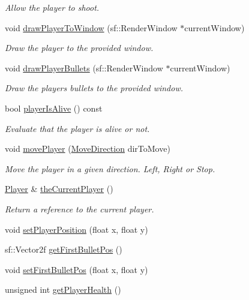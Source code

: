 \begin{DoxyCompactItemize}
\begin{DoxyCompactList}\small\item\em Allow the player to shoot. \end{DoxyCompactList}\item 
void \hyperlink{class_player_manager_a8dfbc91721f7c9cfeae80ae7fa89602e}{draw\+Player\+To\+Window} (sf\+::\+Render\+Window $\ast$current\+Window)
\begin{DoxyCompactList}\small\item\em Draw the player to the provided window. \end{DoxyCompactList}\item 
void \hyperlink{class_player_manager_a503d878624b53851c6fa25559630f544}{draw\+Player\+Bullets} (sf\+::\+Render\+Window $\ast$current\+Window)
\begin{DoxyCompactList}\small\item\em Draw the player\textquotesingle{}s bullets to the provided window. \end{DoxyCompactList}\item 
bool \hyperlink{class_player_manager_ab927a10c2c602c42daf2e11eb8861692}{player\+Is\+Alive} () const
\begin{DoxyCompactList}\small\item\em Evaluate that the player is alive or not. \end{DoxyCompactList}\item 
void \hyperlink{class_player_manager_a95358a4f97cf343f5d5d01a440c5dc76}{move\+Player} (\hyperlink{_player_manager_8h_a00ec4eba48da32d6cbdf827185fd3d34}{Move\+Direction} dir\+To\+Move)
\begin{DoxyCompactList}\small\item\em Move the player in a given direction. Left, Right or Stop. \end{DoxyCompactList}\item 
\hyperlink{class_player}{Player} \& \hyperlink{class_player_manager_aa70cd9ab8f7a582c27bef02e12a408e7}{the\+Current\+Player} ()
\begin{DoxyCompactList}\small\item\em Return a reference to the current player. \end{DoxyCompactList}\item 
void \hyperlink{class_player_manager_afbce199fe8a661b8002ae94b8396c7aa}{set\+Player\+Position} (float x, float y)
\item 
sf\+::\+Vector2f \hyperlink{class_player_manager_a1e058a4c38ae4b17a8541feb40247d06}{get\+First\+Bullet\+Pos} ()
\item 
void \hyperlink{class_player_manager_ae654ee04f5d9820cbb4c6b91161cc7a2}{set\+First\+Bullet\+Pos} (float x, float y)
\item 
unsigned int \hyperlink{class_player_manager_a1e1d29acf1a54f18fafe6a2a91c67ee7}{get\+Player\+Health} ()
\end{DoxyCompactItemize}
